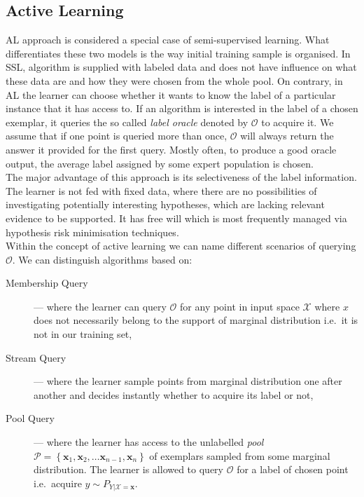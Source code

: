 \documentclass[12pt, a4paper, pdflatex, leqno, twoside]{report}
\begin{document}
\subsection{Active Learning}
AL approach is considered a special case of semi-supervised learning. What 
differentiates these two models is the way initial training sample is 
organised. In SSL, algorithm is supplied with labeled data and does not have 
influence on what these data are and how they were chosen from the whole pool. On 
contrary, in AL the learner can choose whether it wants to know the label of 
a particular instance that it has access to. If an algorithm is interested in the label 
of a chosen exemplar, it queries the so called \emph{label oracle} denoted by 
$\mathscr{O}$ to acquire it. We assume that if one point is queried more than 
once, $\mathscr{O}$ will always return the answer it provided for the first query. 
Mostly often, to produce a good oracle output, the average label assigned by some 
expert population is chosen.\\

The major advantage of this approach is its selectiveness of the label information. The 
learner is not fed with fixed data, where there are no possibilities of 
investigating potentially interesting hypotheses, which are lacking relevant evidence to be 
supported. It has free will which is most frequently managed via  
hypothesis risk minimisation techniques.\\

Within the concept of active learning we can name different scenarios of querying 
$\mathscr{O}$. We can distinguish algorithms based on:
\begin{description}
\item[Membership Query]--- where the learner can query $\mathscr{O}$ for any point in 
input space $\mathscr{X}$ where $x$ does not necessarily belong to the support of 
marginal distribution i.e.\ it is not in our training set,
\item[Stream Query] --- where the learner sample points from marginal distribution one 
after another and decides instantly whether to acquire its label or not,
\item[Pool Query] --- where the learner has access to the unlabelled \emph{pool} $\mathscr{P} 
= \left\{ \mathbf{x}_1, \mathbf{x}_2, \dots \mathbf{x}_{n-1}, \mathbf{x}_n 
\right\}$ of exemplars sampled from some marginal distribution. The learner is 
allowed to query $\mathscr{O}$ for a label of chosen point i.e.\ acquire $y 
\sim P_{Y|\mathscr{X} = \mathbf{x}}$.\\
\end{description}
\end{document}
